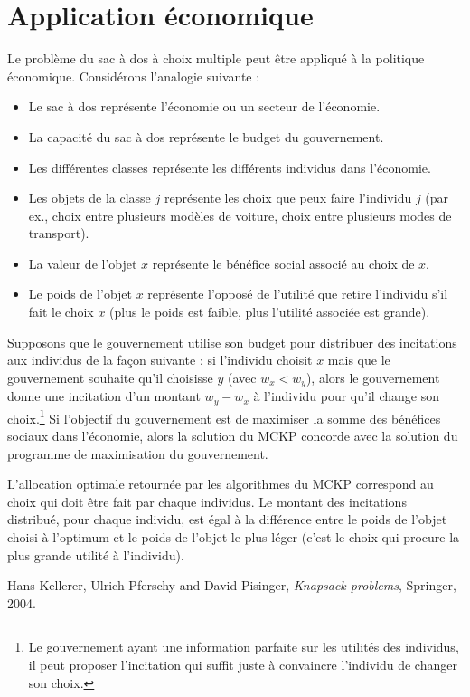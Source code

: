 \documentclass{article}
\begin{document}
\newpage
\section{Application économique}

Le problème du sac à dos à choix multiple peut être appliqué à la politique économique.
Considérons l'analogie suivante :
\begin{itemize}
	\item Le sac à dos représente l'économie ou un secteur de l'économie.
	\item La capacité du sac à dos représente le budget du gouvernement.
	\item Les différentes classes représente les différents individus dans l'économie.
	\item Les objets de la classe $j$ représente les choix que peux faire l'individu $j$ (par ex., choix entre plusieurs modèles de voiture, choix entre plusieurs modes de transport).
	\item La valeur de l'objet $x$ représente le bénéfice social associé au choix de $x$.
	\item Le poids de l'objet $x$ représente l'opposé de l'utilité que retire l'individu s'il fait le choix $x$ (plus le poids est faible, plus l'utilité associée est grande).
\end{itemize}

Supposons que le gouvernement utilise son budget pour distribuer des incitations aux individus de la façon suivante : si l'individu choisit $x$ mais que le gouvernement souhaite qu'il choisisse $y$ (avec $w_x < w_y$), alors le gouvernement donne une incitation d'un montant $w_y - w_x$ à l'individu pour qu'il change son choix.\footnote{Le gouvernement ayant une information parfaite sur les utilités des individus, il peut proposer l'incitation qui suffit juste à convaincre l'individu de changer son choix.}
Si l'objectif du gouvernement est de maximiser la somme des bénéfices sociaux dans l'économie, alors la solution du MCKP concorde avec la solution du programme de maximisation du gouvernement.

L'allocation optimale retournée par les algorithmes du MCKP correspond au choix qui doit être fait par chaque individus.
Le montant des incitations distribué, pour chaque individu, est égal à la différence entre le poids de l'objet choisi à l'optimum et le poids de l'objet le plus léger (c'est le choix qui procure la plus grande utilité à l'individu).

\begin{thebibliography}{9}
  Hans Kellerer, Ulrich Pferschy and David Pisinger,
  \textit{Knapsack problems},
  Springer,
  2004.
\end{thebibliography}
\end{document}
